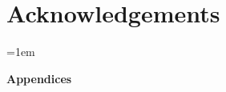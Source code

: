 \documentclass{master_thesis}
\begin{document}





\section*{Acknowledgements}
\thispagestyle{empty}

\tableofcontents
{}
\thispagestyle{empty}



\listoffigures
\thispagestyle{empty}

\begingroup
\let\clearpage\relax
\listoftables
\endgroup


\printacronyms[name=List of Abbreviation]
\thispagestyle{empty}











\emergencystretch=1em
\printbibliography[heading=bibintoc]

\begin{titlepage}
	\begin{center}
		\LARGE \textbf{Appendices}
	\end{center}
\end{titlepage}



\end{document}
